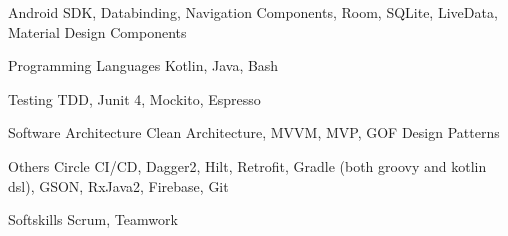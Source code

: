 
\begin{cvskills}

  \cvskill
    {Android} %
    {SDK, Databinding, Navigation Components, Room, SQLite, LiveData, Material Design Components} %

  \cvskill
    {Programming Languages} %
    {Kotlin, Java, Bash} %

  \cvskill
    {Testing} %
    {TDD, Junit 4, Mockito, Espresso} %

  \cvskill
    {Software Architecture} %
    {Clean Architecture, MVVM, MVP, GOF Design Patterns} %

  \cvskill
    {Others} %
    {Circle CI/CD, Dagger2, Hilt, Retrofit, Gradle (both groovy and kotlin dsl), GSON, RxJava2, Firebase, Git} %

  \cvskill
    {Softskills} %
    {Scrum, Teamwork} %

\end{cvskills}